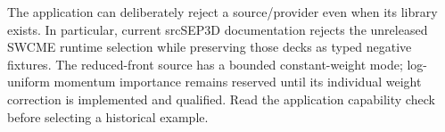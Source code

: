 The application can deliberately reject a source/provider even when its
library exists. In particular, current srcSEP3D documentation rejects the
unreleased SWCME runtime selection while preserving those decks as typed
negative fixtures. The reduced-front source has a bounded constant-weight
mode; log-uniform momentum importance remains reserved until its individual
weight correction is implemented and qualified. Read the application
capability check before selecting a historical example.
